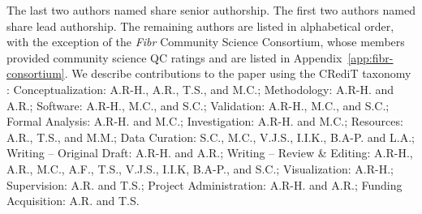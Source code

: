 \documentclass[fleqn,10pt,inline]{wlscirep}
\begin{document}
The last two authors named share senior authorship. The first two authors named
share lead authorship. The remaining authors are listed in alphabetical order,
with the exception of the \emph{Fibr} Community Science Consortium, whose members
provided community science QC ratings and are listed in Appendix~\ref{app:fibr-consortium}.
We describe contributions to the paper using the CRediT taxonomy \cite{brand2015-vd,allen2014-oc}:
Conceptualization: A.R-H., A.R., T.S., and M.C.;
Methodology: A.R-H. and A.R.;
Software: A.R-H., M.C., and S.C.;
Validation: A.R-H., M.C., and S.C.;
Formal Analysis: A.R-H. and M.C.;
Investigation: A.R-H. and M.C.;
Resources: A.R., T.S., and M.M.;
Data Curation: S.C., M.C., V.J.S., I.I.K., B.A-P. and L.A.;
Writing – Original Draft: A.R-H. and A.R.;
Writing – Review \& Editing: A.R-H., A.R., M.C., A.F., T.S., V.J.S., I.I.K, B.A-P., and S.C.;
Visualization: A.R-H.;
Supervision: A.R. and T.S.;
Project Administration: A.R-H. and A.R.;
Funding Acquisition: A.R. and T.S.



\end{document}

